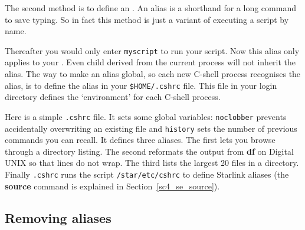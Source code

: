 \documentclass[twoside,11pt,nolof]{starlink}
\providecommand{\latexelsehtml}[2]{#1}
\begin{document}
The second method is to define an .
An alias is a shorthand for a long command to save typing.
So in fact this method is just a variant of executing a script by name.

\begin{small}
\begin{terminalv}
\end{terminalv}
\end{small}
Thereafter you would only enter \texttt{myscript} to run your script. Now
this alias only applies to your . Even child 
derived from the current process will not inherit the alias.  The way
to make an alias global, so each new C-shell process recognises the
alias, is to define the alias in your \texttt{\$HOME/.cshrc} file.  This
file in your login directory defines the `environment' for each
C-shell process.

Here is a simple {\texttt{.cshrc}} file.  It sets some global variables:
\texttt{noclobber} prevents accidentally overwriting an existing file and
\texttt{history} sets the number of previous commands you can recall.  It
defines three aliases.  The first lets you browse through a
directory listing.  The second reformats the output from \textbf{df}
on Digital UNIX so that lines do not wrap.  The third lists the largest
20 files in a directory.  Finally \texttt{.cshrc} runs the script
\texttt{/star/etc/cshrc} to define Starlink aliases (the \textbf{source}
command is explained \latexelsehtml{in
Section~\ref{sc4_se_source}).}{\htmlref{here}{sc4_se_source}).}

\begin{small}
\end{small}

\subsection{Removing aliases
\label{sc4_se_unalias}}
\end{document}
